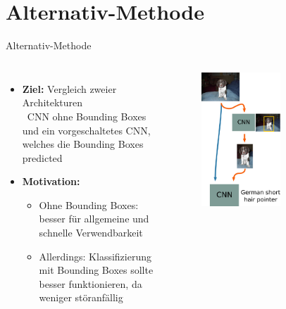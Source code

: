   \section{Alternativ-Methode}
  \begin{frame}{Alternativ-Methode}
    \begin{columns}[c]
      \begin{itemize}\setlength\itemsep{2em}
        \item \textbf{Ziel:} Vergleich zweier Architekturen \\
        \rightarrow \ CNN ohne Bounding Boxes und ein vorgeschaltetes CNN, welches
        die Bounding Boxes predicted
        \item \textbf{Motivation:}
        \begin{itemize}\setlength\itemsep{1em}
          \item Ohne Bounding Boxes: besser für allgemeine und schnelle
          Verwendbarkeit
          \item Allerdings: Klassifizierung mit Bounding Boxes sollte besser funktionieren,
          da weniger störanfällig
        \end{itemize}
      \end{itemize}
      \begin{figure}
        \centering
        \includegraphics[width=0.6\textwidth]{logos/alternative_method.pdf}

\end{figure}
\end{columns}
\end{frame}
